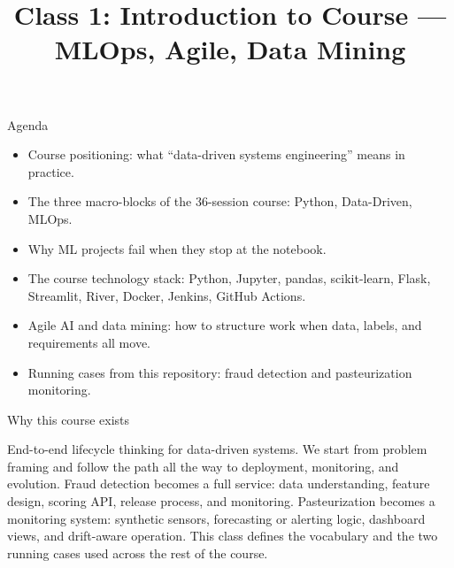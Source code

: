 

\title{Class 1: Introduction to Course --- MLOps, Agile, Data Mining}
\author{\coursename}
\date{}



\frame{\titlepage \coursefooter}

\begin{frame}{Agenda}
\begin{itemize}
\item Course positioning: what ``data-driven systems engineering'' means in practice.
\item The three macro-blocks of the 36-session course: Python, Data-Driven, MLOps.
\item Why ML projects fail when they stop at the notebook.
\item The course technology stack: Python, Jupyter, pandas, scikit-learn, Flask, Streamlit, River, Docker, Jenkins, GitHub Actions.
\item Agile AI and data mining: how to structure work when data, labels, and requirements all move.
\item Running cases from this repository: fraud detection and pasteurization monitoring.
\end{itemize}
\coursefooter
\end{frame}

\begin{frame}{Why this course exists}
\coursefooter
\end{frame}

\coursecontextframe
{End-to-end lifecycle thinking for data-driven systems.}
{We start from problem framing and follow the path all the way to deployment, monitoring, and evolution.}
{Fraud detection becomes a full service: data understanding, feature design, scoring API, release process, and monitoring.}
{Pasteurization becomes a monitoring system: synthetic sensors, forecasting or alerting logic, dashboard views, and drift-aware operation.}
{This class defines the vocabulary and the two running cases used across the rest of the course.}

